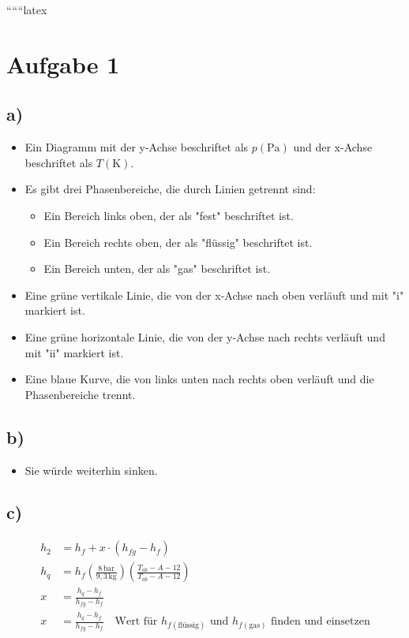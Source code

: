 
``````latex


\section*{Aufgabe 1}

\subsection*{a)}

\begin{itemize}
    \item Ein Diagramm mit der y-Achse beschriftet als $p(\text{Pa})$ und der x-Achse beschriftet als $T(\text{K})$. 
    \item Es gibt drei Phasenbereiche, die durch Linien getrennt sind:
    \begin{itemize}
        \item Ein Bereich links oben, der als "fest" beschriftet ist.
        \item Ein Bereich rechts oben, der als "flüssig" beschriftet ist.
        \item Ein Bereich unten, der als "gas" beschriftet ist.
    \end{itemize}
    \item Eine grüne vertikale Linie, die von der x-Achse nach oben verläuft und mit "i" markiert ist.
    \item Eine grüne horizontale Linie, die von der y-Achse nach rechts verläuft und mit "ii" markiert ist.
    \item Eine blaue Kurve, die von links unten nach rechts oben verläuft und die Phasenbereiche trennt.
\end{itemize}

\subsection*{b)}

\begin{itemize}
    \item Sie würde weiterhin sinken.
\end{itemize}

\subsection*{c)}

\begin{align*}
    h_2 &= h_f + x \cdot (h_{fg} - h_f) \\
    h_q &= h_f \left( \frac{8 \, \text{bar}}{9,3 \, \text{kg}} \right) \left( \frac{T_{ab} - A - 12}{T_{ab} - A - 12} \right) \\
    x &= \frac{h_q - h_{f}}{h_{fg} - h_{f}} \\
    x &= \frac{h_q - h_{f}}{h_{fg} - h_{f}} \quad \text{Wert für } h_{f(\text{flüssig})} \text{ und } h_{f(\text{gas})} \text{ finden und einsetzen}
\end{align*}

